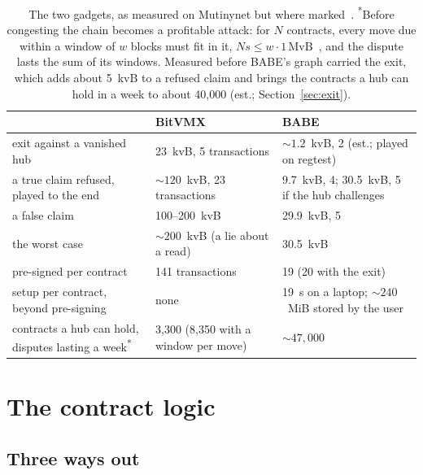 \documentclass[11pt]{article}
\begin{document}
\begin{table}[!htp]
\centering
\small
\begin{tabularx}{\linewidth}{>{\raggedright\arraybackslash}p{58mm}LL}
\toprule
& BitVMX & BABE \\
\midrule
exit against a vanished hub & 23~kvB, 5 transactions & ${\sim}1.2$~kvB, 2 (est.; played on regtest) \\
a true claim refused, played to the end & ${\sim}120$~kvB, 23 transactions & 9.7~kvB, 4; 30.5~kvB, 5 if the hub challenges \\
a false claim & 100--200~kvB & 29.9~kvB, 5 \\
the worst case & ${\sim}200$~kvB (a lie about a read) & 30.5~kvB \\
pre-signed per contract & 141 transactions & 19 (20 with the exit) \\
setup per contract, beyond pre-signing & none & 19~s on a laptop; ${\sim}240$~MiB stored by the user \\
contracts a hub can hold, disputes lasting a week\textsuperscript{*} & 3,300 (8,350 with a window per move) & ${\sim}47{,}000$ \\
\bottomrule
\end{tabularx}
\caption{The two gadgets, as measured on Mutinynet but where marked~\cite{lichenbitvmx,lichenbabe}.
\textsuperscript{*}Before congesting the chain becomes a profitable
attack: for $N$ contracts, every move due within a window of $w$ blocks
must fit in it, $N s \le w \cdot 1\,\mathrm{MvB}$~\cite{floodloot}, and
the dispute lasts the sum of its windows. Measured before BABE's graph
carried the exit, which adds about 5~kvB to a refused claim and brings
the contracts a hub can hold in a week to about 40,000 (est.;
Section~\ref{sec:exit}).}
\label{tab:gadgets}
\end{table}

\section{The contract logic}
\label{sec:contract}

\subsection{Three ways out}
\end{document}
